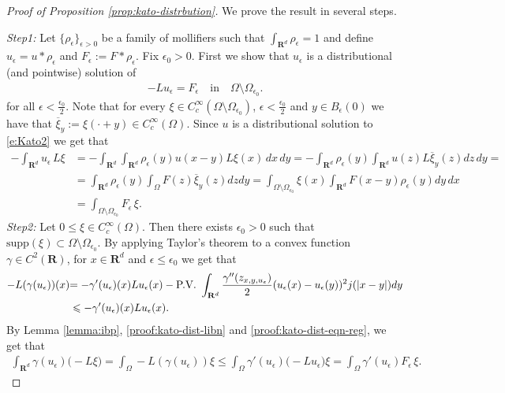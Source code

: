 \documentclass[a4paper,12pt,draft]{article}
\theoremstyle{plain}
\theoremstyle{definition}
\numberwithin{equation}{section}
\newcommand{\rd}{\mathbf{R}^d}
\newcommand\R{\mathbf{R}}
\renewcommand{\le}{\leqslant}
\renewcommand{\leq}{\leqslant}
\newcommand{\1}{1}
\begin{document}
\begin{proof}[Proof of Proposition \ref{prop:kato-distrbution}]
 We prove the result in several steps.  

\textit{Step1:} 
Let $\{\rho_\epsilon\}_{\epsilon>0}$ be a family of mollifiers such that $\int_{\rd} \rho_\epsilon =1$ and define $u_{\epsilon} = u * \rho_\epsilon$ and $F_{\epsilon}:= F * \rho_{\epsilon}$. Fix $\epsilon_0>0$. First we show that $u_{\epsilon}$ is a distributional (and pointwise) solution of 
\begin{align}\label{proof:kato-dist-eqn-reg}
    -L u_{\epsilon} = F_{\epsilon} \quad \text{in} \quad \Omega\setminus\Omega_{\epsilon_0}. 
\end{align}
for all $\epsilon< \frac{\epsilon_0}{2}$. Note that for every $\xi\in C_c^\infty(\Omega\setminus\Omega_{\epsilon_0})$, $\epsilon< \frac{\epsilon_0}{2}$ and $y\in B_\epsilon(0)$ we have that $\overline{\xi}_y:= \xi (\cdot + y) \in C^{\infty}_c(\Omega)$. Since $u$ is a distributional solution to \eqref{e:Kato2} we get that
\begin{align*}
    -\int_{\rd} u_{\epsilon} \, L \xi& = -\int_{\rd} \int_{\rd} \rho_{\epsilon}(y) u(x-y) L\xi(x) \, dx \, dy = -\int_{\rd} \rho_{\epsilon}(y)  \int_{\rd} u(z) L\overline{\xi}_y(z) dz \, dy =\nonumber\\
    &=\int_{\rd} \rho_\epsilon (y) \int_{\Omega} F(z) \overline{\xi}_y(z) dz dy
    =\int_{\Omega\setminus\Omega_{\epsilon_0}} \xi(x) \int_{\rd} F(x-y) \rho_{\epsilon}(y) dy \, dx\nonumber\\
    &= \int_{\Omega\setminus\Omega_{\epsilon_0}} F_{\epsilon} \, \xi.
\end{align*}
\textit{Step2:} Let $0\leq \xi \in C^{\infty}_c(\Omega)$. Then there exists $\epsilon_0>0$ such that $\text{supp}(\xi) \subset \Omega\setminus\Omega_{\epsilon_0}$. 
By applying Taylor's theorem to a convex function $\gamma \in C^2 (\R)$, for $x\in \rd$ and $\epsilon\le \epsilon_0$ we get that
\begin{align}\label{proof:kato-dist-libn}
{ - L(\gamma(u_\epsilon))(x)} &  { =   - \gamma'(u_\epsilon)(x) L u_\epsilon(x) -  \text{P.V. }\int_{\R^d} \frac{\gamma''(z_{x,y,u_\epsilon})}{2}(u_\epsilon(x)-u_\epsilon(y))^2 j(|x-y|) dy }\notag \\  
   & \leq - \gamma'(u_\epsilon)(x) L u_\epsilon(x).
\end{align}
By Lemma \ref{lemma:ibp},  \eqref{proof:kato-dist-libn} and \eqref{proof:kato-dist-eqn-reg}, we get that  
\begin{align}\label{proof:kato-dist-eps-ineq}
    \int_{\rd}  \gamma(u_\epsilon) \big(-L\xi\big)= \int_{\Omega}  -L(\gamma(u_\epsilon))\xi \leq \int_{\Omega}  \gamma'(u_\epsilon) \big(-L u_\epsilon\big) \xi = \int_{\Omega} \gamma'(u_\epsilon)F_\epsilon \, \xi. 
\end{align}


\end{proof}
\end{document}
